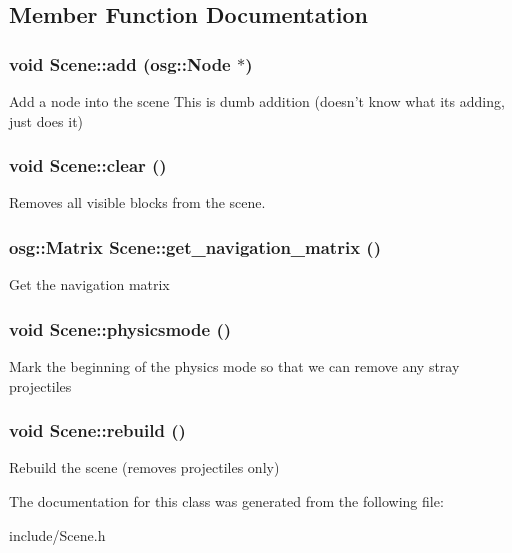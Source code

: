 \subsection{Member Function Documentation}
\hypertarget{class_scene_a894ec82f29999e3a24231d64196eb579}{
\subsubsection[{add}]{\setlength{\rightskip}{0pt plus 5cm}void Scene::add (osg::Node $\ast$)}}
\label{class_scene_a894ec82f29999e3a24231d64196eb579}
Add a node into the scene This is dumb addition (doesn't know what its adding, just does it) \hypertarget{class_scene_a70e5b1218abb729d70d9f41b107017f9}{
\subsubsection[{clear}]{\setlength{\rightskip}{0pt plus 5cm}void Scene::clear ()}}
\label{class_scene_a70e5b1218abb729d70d9f41b107017f9}
Removes all visible blocks from the scene. \hypertarget{class_scene_ada1eae6ca9a770ef9d3b492403719893}{
\subsubsection[{get\_\-navigation\_\-matrix}]{\setlength{\rightskip}{0pt plus 5cm}osg::Matrix Scene::get\_\-navigation\_\-matrix ()}}
\label{class_scene_ada1eae6ca9a770ef9d3b492403719893}
Get the navigation matrix \hypertarget{class_scene_a28fba12cc43c64e3216f463984f5ff7f}{
\subsubsection[{physicsmode}]{\setlength{\rightskip}{0pt plus 5cm}void Scene::physicsmode ()}}
\label{class_scene_a28fba12cc43c64e3216f463984f5ff7f}
Mark the beginning of the physics mode so that we can remove any stray projectiles \hypertarget{class_scene_a14255fd5c923aa081dfe4e32db589404}{
\subsubsection[{rebuild}]{\setlength{\rightskip}{0pt plus 5cm}void Scene::rebuild ()}}
\label{class_scene_a14255fd5c923aa081dfe4e32db589404}
Rebuild the scene (removes projectiles only) 

The documentation for this class was generated from the following file:\begin{DoxyCompactItemize}
\item 
include/Scene.h\end{DoxyCompactItemize}
